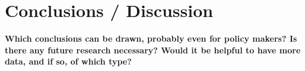 \documentclass[
  journal=small,
  manuscript=mini-article,  %
  year=2023,
  volume=1,
]{odj-journal}
\begin{document}
\section{Conclusions / Discussion}
\textbf{Which conclusions can be drawn, probably even for policy makers? Is there any future research necessary? Would it be helpful to have more data, and if so, of which type?}\lipsum[1] 








\end{document}
